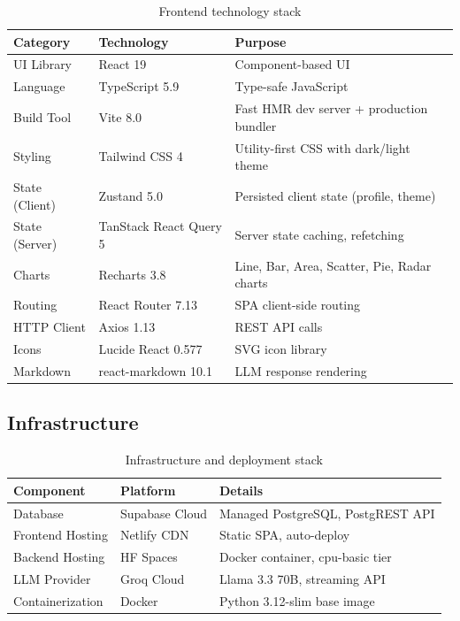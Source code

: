 \documentclass[12pt, a4paper, oneside]{report}
\begin{document}
\begin{table}[H]
\centering
\caption{Frontend technology stack}
\label{tab:frontend_stack}
\begin{tabularx}{\textwidth}{@{}l l X@{}}
\toprule
\textbf{Category} & \textbf{Technology} & \textbf{Purpose} \\
\midrule
UI Library & React 19 & Component-based UI \\
Language & TypeScript 5.9 & Type-safe JavaScript \\
Build Tool & Vite 8.0 & Fast HMR dev server + production bundler \\
Styling & Tailwind CSS 4 & Utility-first CSS with dark/light theme \\
State (Client) & Zustand 5.0 & Persisted client state (profile, theme) \\
State (Server) & TanStack React Query 5 & Server state caching, refetching \\
Charts & Recharts 3.8 & Line, Bar, Area, Scatter, Pie, Radar charts \\
Routing & React Router 7.13 & SPA client-side routing \\
HTTP Client & Axios 1.13 & REST API calls \\
Icons & Lucide React 0.577 & SVG icon library \\
Markdown & react-markdown 10.1 & LLM response rendering \\
\bottomrule
\end{tabularx}
\end{table}

\subsection{Infrastructure}

\begin{table}[H]
\centering
\caption{Infrastructure and deployment stack}
\label{tab:infra_stack}
\begin{tabularx}{\textwidth}{@{}l l X@{}}
\toprule
\textbf{Component} & \textbf{Platform} & \textbf{Details} \\
\midrule
Database & Supabase Cloud & Managed PostgreSQL, PostgREST API \\
Frontend Hosting & Netlify CDN & Static SPA, auto-deploy \\
Backend Hosting & HF Spaces & Docker container, cpu-basic tier \\
LLM Provider & Groq Cloud & Llama 3.3 70B, streaming API \\
Containerization & Docker & Python 3.12-slim base image \\
\bottomrule
\end{tabularx}
\end{table}
\end{document}
